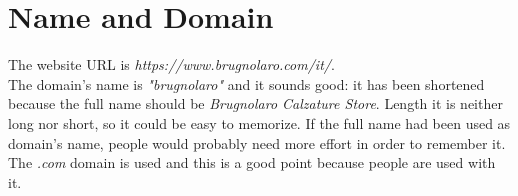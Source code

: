 \section{Name and Domain}
The website URL is \textit{https://www.brugnolaro.com/it/}.\\
The domain's name is \textit{"brugnolaro"} and it sounds good: it has been
shortened because the full name should be \textit{Brugnolaro Calzature
Store}. Length it is neither long nor short, so it could be easy to memorize.
If the full name had been used as domain's name, people would probably need
more effort in order to remember it.\\
The \textit{.com} domain is used and this is a good point because people are
used with it.